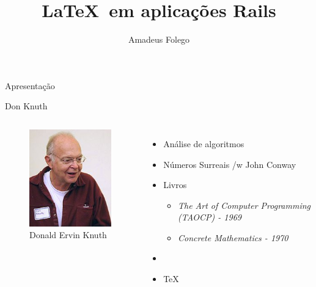 \documentclass{beamer}
\author{Amadeus Folego}
\title{\LaTeX\ em aplicações Rails}
\date{}
\institute{
  \begin{tabular}{c c}
    {\em www} & \url{http://badosu.com}\\
    {\em email} & \url{amadeusfolego@gmail.com}
  \end{tabular}
}
\begin{document}
  \begin{frame}[plain]
    \titlepage
  \end{frame}
  \begin{frame}{Apresentação}
  \end{frame}
  \begin{frame}{Don Knuth}
    \begin{columns}[c]
        \begin{figure}[t]
          \includegraphics[width=\columnwidth]{192px-KnuthAtOpenContentAlliance}
          \caption*{\scriptsize Donald Ervin Knuth}
        \end{figure}
        \begin{itemize}
          \item Análise de algoritmos \pause
          \item Números Surreais /w John Conway \pause
          \item Livros \pause
            \begin{itemize}
              \item {\em The Art of Computer Programming (TAOCP) - 1969} \pause
              \item {\em Concrete Mathematics - 1970} \pause
            \end{itemize}
          \item \MF\pause
          \item \TeX\
        \end{itemize}
    \end{columns}
  \end{frame}
\end{document}
